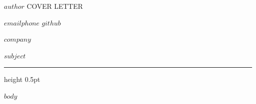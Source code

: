 \documentclass[11pt,a4paper]{article}
\begin{document}
\color{ink}
\begingroup
\setlength{\parskip}{0pt}
\noindent
{\fontsize{27}{31}\selectfont\namefont\namehangulfont\color{heading}$author$}%
\hfill{\fontsize{8.5}{11}\selectfont{}\color{accent}COVER LETTER}\par
\vspace{4pt}
{\fontsize{9}{12}\selectfont\color{muted}%
  \href{mailto:$email$}{$email$}\enspace\textperiodcentered\enspace$phone$%
  \enspace\textperiodcentered\enspace\href{https://github.com/$github$}{$github$}\par}
\vspace{21pt}
{\fontsize{20}{25}\selectfont\bfseries\color{heading}$company$\par}
\vspace{4pt}
{\fontsize{10.5}{14}\selectfont\color{accent}$subject$\par}
\vspace{10pt}
{\color{rulegray}\hrule height 0.5pt}
\endgroup
\vspace{6pt}
\fontsize{10.5}{17}\selectfont
$body$
\end{document}
